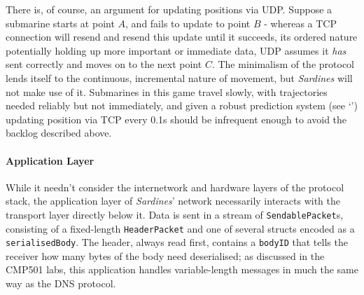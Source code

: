 \documentclass[a4paper, 9pt]{article}
\begin{document}
\begin{flushleft}
\vspace{5pt}\noindent
There is, of course, an argument for updating positions via UDP. Suppose a submarine starts at point $A$, and fails to update to point $B$ - whereas a TCP connection will resend and resend this update until it succeeds, its ordered nature potentially holding up more important or immediate data, UDP assumes it \textit{has} sent correctly and moves on to the next point $C$. The minimalism of the protocol lends itself to the continuous, incremental nature of movement, but \textit{Sardines} will not make use of it. Submarines in this game travel slowly, with trajectories needed reliably but not immediately, and given a robust prediction system (see `') updating position via TCP every 0.1s should be infrequent enough to avoid the backlog described above.

\paragraph{Application Layer} 

While it needn't consider the internetwork and hardware layers of the protocol stack, the application layer of \textit{Sardines}' network necessarily interacts with the transport layer directly below it. Data is sent in a stream of \texttt{SendablePacket}s, consisting of a fixed-length \texttt{HeaderPacket} and one of several structs encoded as a \texttt{serialisedBody}. The header, always read first, contains a \texttt{bodyID}  that tells the receiver how many bytes of the body need deserialised; as discussed in the CMP501 labs, this application handles variable-length messages in much the same way as the DNS protocol.


\end{flushleft}
\end{document}
